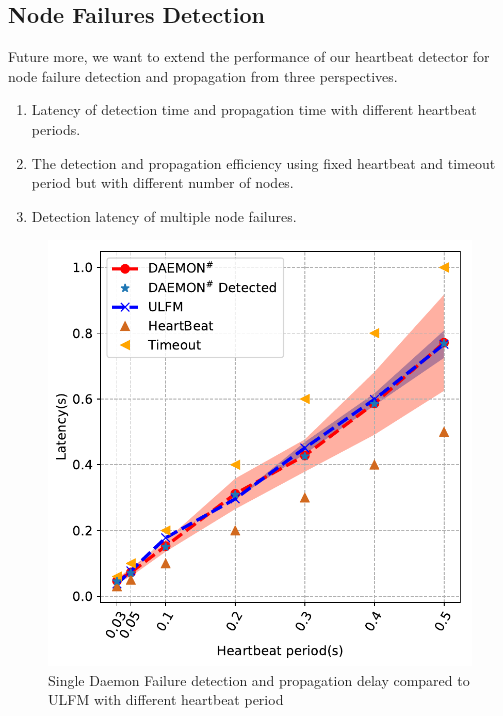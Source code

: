 \documentclass[sigconf]{acmart}
\newcommand{\ulfm}[0]{\textsc{ULFM}\xspace}
\begin{document}
\subsection{Node Failures Detection}
Future more, we want to extend the performance of our heartbeat detector  for node failure detection and propagation from  three perspectives. 
\begin{enumerate}
  \item Latency of detection time and propagation time with different heartbeat periods.
  \item The detection and propagation efficiency using fixed heartbeat and timeout period but with different number of nodes.
  \item Detection latency of multiple node failures.
\end{enumerate}

\begin{figure}[h]
  \centering
  \includegraphics[width=\linewidth]{PRRTE_ULFM_comparision.pdf}
  \caption{Single Daemon Failure detection and propagation delay compared to \ulfm with different heartbeat period}
  \label{fig:node_failure_hb}
\end{figure}
\end{document}
